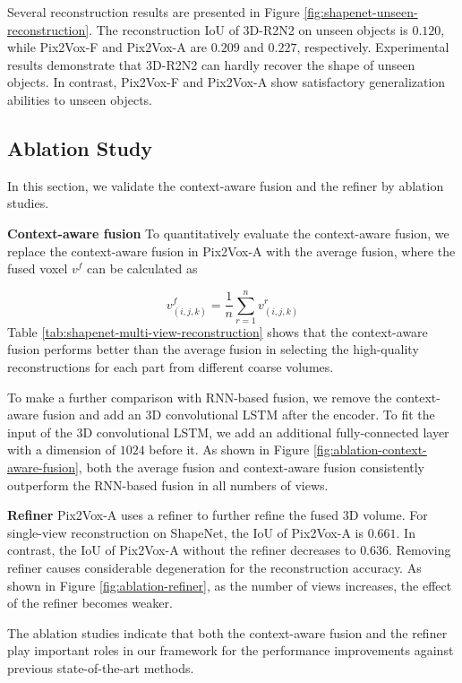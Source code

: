 \documentclass[10pt,twocolumn,letterpaper]{article}
\begin{document}
Several reconstruction results are presented in Figure \ref{fig:shapenet-unseen-reconstruction}.
The reconstruction IoU of 3D-R2N2 on unseen objects is $0.120$, while Pix2Vox-F and Pix2Vox-A are $0.209$ and $0.227$, respectively.
Experimental results demonstrate that 3D-R2N2 can hardly recover the shape of unseen objects.
In contrast, Pix2Vox-F and Pix2Vox-A show satisfactory generalization abilities to unseen objects.

\subsection{Ablation Study}

In this section, we validate the context-aware fusion and the refiner by ablation studies.

\noindent \textbf{Context-aware fusion}
To quantitatively evaluate the context-aware fusion, we replace the context-aware fusion in Pix2Vox-A with the average fusion, where the fused voxel $v^f$ can be calculated as

\begin{equation}
  v^f_{(i, j, k)} = \frac{1}{n} \sum_{r=1}^n v^r_{(i, j, k)}
\end{equation}
Table \ref{tab:shapenet-multi-view-reconstruction} shows that the context-aware fusion performs better than the average fusion in selecting the high-quality reconstructions for each part from different coarse volumes.

To make a further comparison with RNN-based fusion, we remove the context-aware fusion and add an 3D convolutional LSTM \cite{DBLP:conf/eccv/ChoyXGCS16} after the encoder.
To fit the input of the 3D convolutional LSTM, we add an additional fully-connected layer with a dimension of $1024$ before it.
As shown in Figure \ref{fig:ablation-context-aware-fusion}, both the average fusion and context-aware fusion consistently outperform the RNN-based fusion in all numbers of views. 

\noindent \textbf{Refiner}
Pix2Vox-A uses a refiner to further refine the fused 3D volume.
For single-view reconstruction on ShapeNet, the IoU of Pix2Vox-A is $0.661$. 
In contrast, the IoU of Pix2Vox-A without the refiner decreases to $0.636$.
Removing refiner causes considerable degeneration for the reconstruction accuracy.
As shown in Figure \ref{fig:ablation-refiner}, as the number of views increases, the effect of the refiner becomes weaker.

The ablation studies indicate that both the context-aware fusion and the refiner play important roles in our framework for the performance improvements against previous state-of-the-art methods.
\end{document}
